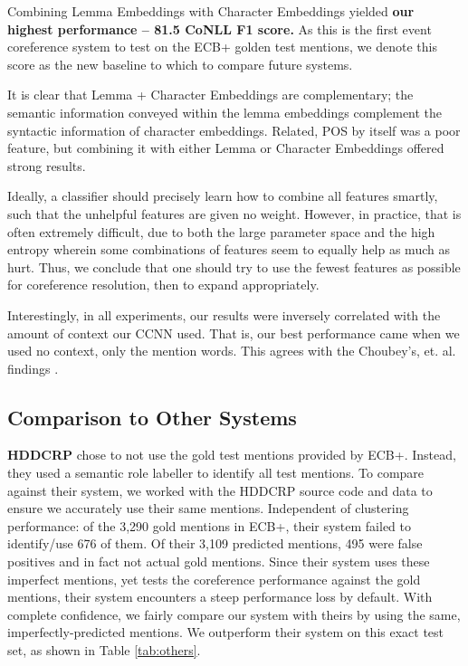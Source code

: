 \documentclass[11pt,a4paper]{article}
\begin{document}
Combining Lemma Embeddings with Character Embeddings yielded \textbf{our highest performance -- 81.5 CoNLL F1 score.}  As this is the first event coreference system to test on the ECB+ golden test mentions, we denote this score as the new baseline to which to compare future systems.

It is clear that Lemma + Character Embeddings are complementary; the semantic information conveyed within the lemma embeddings complement the syntactic information of character embeddings.  Related, POS by itself was a poor feature, but combining it with either Lemma or Character Embeddings offered strong results. 

Ideally, a classifier should precisely learn how to combine all features smartly, such that the unhelpful features are given no weight.  However, in practice, that is often extremely difficult, due to both the large parameter space and the high entropy wherein some combinations of features seem to equally help as much as hurt.  Thus, we conclude that one should try to use the fewest features as possible for coreference resolution, then to expand appropriately.

Interestingly, in all experiments, our results were inversely correlated with the amount of context our CCNN used.  That is, our best performance came when we used no context, only the mention words.  This agrees with the Choubey's, et. al. findings .

\subsection{Comparison to Other Systems}
\textbf{HDDCRP} chose to not use the gold test mentions provided by ECB+.  Instead, they used a semantic role labeller to identify all test mentions.
To compare against their system, we worked with the HDDCRP source code and data to ensure we accurately use their same mentions.  Independent of clustering performance: of the 3,290 gold mentions in ECB+, their system failed to identify/use 676 of them.  Of their 3,109 predicted mentions, 495 were false positives and in fact not actual gold mentions.  Since their system uses these imperfect mentions, yet tests the coreference performance against the gold mentions, their system encounters a steep performance loss by default.  With complete confidence, we fairly compare our system with theirs by using the same, imperfectly-predicted mentions.  We outperform their system on this exact test set, as shown in Table \ref{tab:others}.
\end{document}
